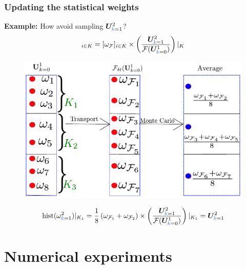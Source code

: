 \documentclass[10 pt]{beamer}
\begin{document}
%
\begin{frame}
  \frametitle{Updating the statistical weights}
  \textcolor{cadmiumgreen}{\textbf{Example:}} How avoid sampling ${\bm U}_{\kk=1}^2$?
  \begin{equation*}
[\omega_1^2]_{i\in K} = [\omega_{\mathcal{F}}]_{i \in K} \times \left(\frac{{\bm U}_{\kk=1}^2}{\mathcal{F}({\bm U}_{\kk=0}^1)}  \right)|_{K}
    \end{equation*}
  \begin{figure}
    \centering
    \includegraphics[scale=0.45]{image/reweighting-cropped}
  \end{figure}
  \begin{equation*}
    \mathrm{hist}(\omega_{\kk=1}^2)|_{K_1} = \frac{1}{8} \left(\omega_{\mathcal{F}_1} + \omega_{\mathcal{F}_2}\right) \times \left(\frac{{\bm U}_{\kk=1}^2}{\mathcal{F}({\bm U}_{\kk=0}^1)}\right)|_{K_1} = {\bm U}_{\kk=1}^2
  \end{equation*}
  \end{frame}

%
\section{Numerical experiments}
\end{document}
